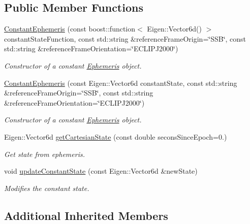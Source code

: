 \subsection*{Public Member Functions}
\begin{DoxyCompactItemize}
\item 
\hyperlink{classtudat_1_1ephemerides_1_1ConstantEphemeris_a77a906c06e51beff654cb5abcad438fa}{Constant\+Ephemeris} (const boost\+::function$<$ Eigen\+::\+Vector6d() $>$ constant\+State\+Function, const std\+::string \&reference\+Frame\+Origin=\char`\"{}S\+SB\char`\"{}, const std\+::string \&reference\+Frame\+Orientation=\char`\"{}E\+C\+L\+I\+P\+J2000\char`\"{})
\begin{DoxyCompactList}\small\item\em Constructor of a constant \hyperlink{classtudat_1_1ephemerides_1_1Ephemeris}{Ephemeris} object. \end{DoxyCompactList}\item 
\hyperlink{classtudat_1_1ephemerides_1_1ConstantEphemeris_a6b2790cfaed758ff3737111afa99c5ad}{Constant\+Ephemeris} (const Eigen\+::\+Vector6d constant\+State, const std\+::string \&reference\+Frame\+Origin=\char`\"{}S\+SB\char`\"{}, const std\+::string \&reference\+Frame\+Orientation=\char`\"{}E\+C\+L\+I\+P\+J2000\char`\"{})
\begin{DoxyCompactList}\small\item\em Constructor of a constant \hyperlink{classtudat_1_1ephemerides_1_1Ephemeris}{Ephemeris} object. \end{DoxyCompactList}\item 
Eigen\+::\+Vector6d \hyperlink{classtudat_1_1ephemerides_1_1ConstantEphemeris_ae7f535c4585ecf1d7a20fa0aedfbc91f}{get\+Cartesian\+State} (const double secons\+Since\+Epoch=0.)
\begin{DoxyCompactList}\small\item\em Get state from ephemeris. \end{DoxyCompactList}\item 
void \hyperlink{classtudat_1_1ephemerides_1_1ConstantEphemeris_a9afd90e3a4f200a9db318f1ce9e5e56a}{update\+Constant\+State} (const Eigen\+::\+Vector6d \&new\+State)
\begin{DoxyCompactList}\small\item\em Modifies the constant state. \end{DoxyCompactList}\end{DoxyCompactItemize}
\subsection*{Additional Inherited Members}


